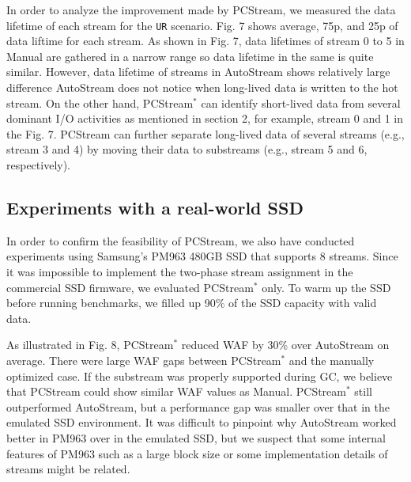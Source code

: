 In order to analyze the improvement made by \textsf{\small PCStream}, 
we measured the data lifetime of each stream for the {\tt UR} scenario.
Fig. 7 shows average, 75p, and 25p of data liftime 
for each stream.
As shown in Fig. 7, data lifetimes of stream 0 to 5
in \textsf{\small Manual} are gathered in a narrow range so data lifetime in
the same is quite similar.
However, data lifetime of streams in \textsf{\small AutoStream} shows relatively large difference
\textsf{\small AutoStream} does not notice when long-lived data is written to
the hot stream.
On the other hand, \textsf{\small PCStream$^*$} can identify short-lived data from 
several dominant I/O activities as mentioned 
in section 2, for example, stream 0 and 1 in the Fig. 7.
\textsf{\small PCStream} can further separate long-lived data of several streams 
(e.g., stream 3 and 4)
by moving their data to substreams (e.g., stream 5 and 6, respectively). 

\vspace{-10pt}
\subsection{Experiments with a real-world SSD}


In order to confirm the feasibility of \textsf{\small PCStream}, we also have
conducted experiments using Samsung's PM963 480GB SSD that supports 8 streams.
Since it was impossible to implement the two-phase stream assignment in the
commercial SSD firmware, we evaluated \textsf{\small PCStream$^*$} only.  To warm up the
SSD before running benchmarks, we filled up 90\% of the SSD capacity with valid
data.

As illustrated in Fig. 8, \textsf{\small PCStream$^*$} reduced WAF by
30\% over \textsf{\small AutoStream} on average.  There were large WAF gaps between
\textsf{\small PCStream$^{*}$} and the manually optimized case.  If the substream was
properly supported during GC, we believe that \textsf{\small PCStream} could show
similar WAF values as \textsf{\small Manual}.  \textsf{\small PCStream$^*$} still
outperformed \textsf{\small AutoStream}, but a performance gap was smaller over that
in the emulated SSD environment.  It was difficult to pinpoint why
\textsf{\small AutoStream} worked better in PM963 over in the emulated SSD, but we
suspect that some internal features of PM963 such as a large block size or some
implementation details of streams might be related. 

